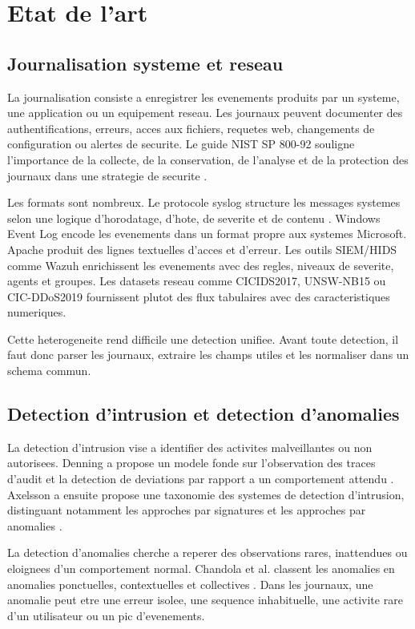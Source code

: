 \chapter{Etat de l'art}

\section{Journalisation systeme et reseau}
La journalisation consiste a enregistrer les evenements produits par un systeme, une application ou un equipement reseau. Les journaux peuvent documenter des authentifications, erreurs, acces aux fichiers, requetes web, changements de configuration ou alertes de securite. Le guide NIST SP 800-92 souligne l'importance de la collecte, de la conservation, de l'analyse et de la protection des journaux dans une strategie de securite \cite{nist80092}.

Les formats sont nombreux. Le protocole syslog structure les messages systemes selon une logique d'horodatage, d'hote, de severite et de contenu \cite{rfc5424}. Windows Event Log encode les evenements dans un format propre aux systemes Microsoft. Apache produit des lignes textuelles d'acces et d'erreur. Les outils SIEM/HIDS comme Wazuh enrichissent les evenements avec des regles, niveaux de severite, agents et groupes. Les datasets reseau comme CICIDS2017, UNSW-NB15 ou CIC-DDoS2019 fournissent plutot des flux tabulaires avec des caracteristiques numeriques.

Cette heterogeneite rend difficile une detection unifiee. Avant toute detection, il faut donc parser les journaux, extraire les champs utiles et les normaliser dans un schema commun.

\section{Detection d'intrusion et detection d'anomalies}
La detection d'intrusion vise a identifier des activites malveillantes ou non autorisees. Denning a propose un modele fonde sur l'observation des traces d'audit et la detection de deviations par rapport a un comportement attendu \cite{denning1987intrusion}. Axelsson a ensuite propose une taxonomie des systemes de detection d'intrusion, distinguant notamment les approches par signatures et les approches par anomalies \cite{axelsson2000intrusion}.

La detection d'anomalies cherche a reperer des observations rares, inattendues ou eloignees d'un comportement normal. Chandola et al. classent les anomalies en anomalies ponctuelles, contextuelles et collectives \cite{chandola2009anomaly}. Dans les journaux, une anomalie peut etre une erreur isolee, une sequence inhabituelle, une activite rare d'un utilisateur ou un pic d'evenements.

